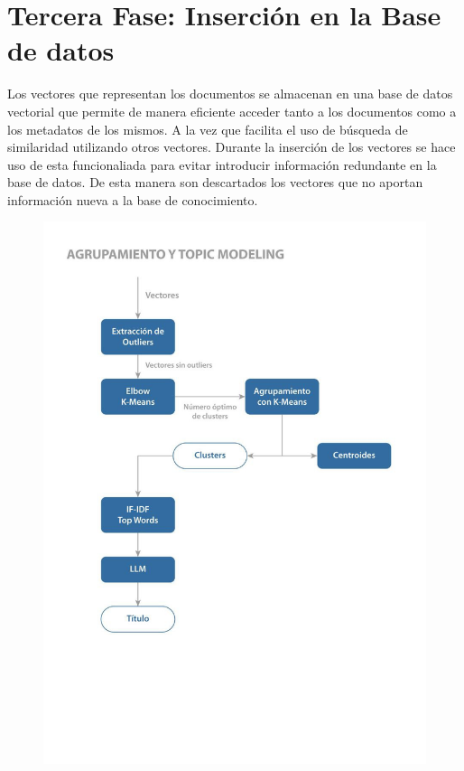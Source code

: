     \section{Tercera Fase: Inserción en la Base de datos}
    Los vectores que representan los documentos se almacenan en una base de datos vectorial que permite de manera eficiente acceder tanto a los documentos como a los metadatos de los mismos. A la vez que facilita el uso de búsqueda de similaridad utilizando otros vectores. Durante la inserción de los vectores se hace uso de esta funcionaliada para evitar introducir información redundante en la base de datos. De esta manera son descartados los vectores que no aportan información nueva a la base de conocimiento.

    \begin{figure}[H]    
        \centering
        \includegraphics[scale = 1]{Figures/pipeline_3.jpg}
        \caption*{}
    \end{figure}

